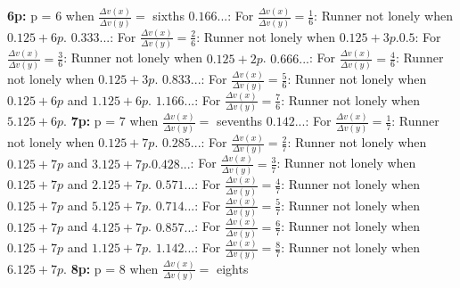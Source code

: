 \documentclass[12pt, a4paper]{article}
\begin{document}
\newline
\newline
\textbf{6p:}
p = $6$ when $\frac{\Delta v(x)}{\Delta v(y)} =$ sixths
\newline
\newline
$0.166...$: For $\frac{\Delta v(x)}{\Delta v(y)} = \frac{1}{6}$: Runner not lonely when $0.125+6p$. \newline $0.333...$: For $\frac{\Delta v(x)}{\Delta v(y)} = \frac{2}{6}$: Runner not lonely when $0.125+3p$.\newline $0.5$: For $\frac{\Delta v(x)}{\Delta v(y)} = \frac{3}{6}$: Runner not lonely when $0.125+2p$. \newline $0.666...$: For $\frac{\Delta v(x)}{\Delta v(y)} = \frac{4}{6}$: Runner not lonely when $0.125+3p$. \newline $0.833...$: For $\frac{\Delta v(x)}{\Delta v(y)} = \frac{5}{6}$: Runner not lonely when $0.125+6p$ and $1.125+6p$. \newline $1.166...$: For $\frac{\Delta v(x)}{\Delta v(y)} = \frac{7}{6}$: Runner not lonely when $5.125+6p$.
\newline
\newline
\textbf{7p:}
p = $7$ when $\frac{\Delta v(x)}{\Delta v(y)} =$ sevenths
\newline
\newline
$0.142...$: For $\frac{\Delta v(x)}{\Delta v(y)} = \frac{1}{7}$: Runner not lonely when $0.125+7p$. \newline $0.285...$: For $\frac{\Delta v(x)}{\Delta v(y)} = \frac{2}{7}$: Runner not lonely when $0.125+7p$ and $3.125+7p$.\newline $0.428...$: For $\frac{\Delta v(x)}{\Delta v(y)} = \frac{3}{7}$: Runner not lonely when $0.125+7p$ and $2.125+7p$. \newline $0.571...$: For $\frac{\Delta v(x)}{\Delta v(y)} = \frac{4}{7}$: Runner not lonely when $0.125+7p$ and $5.125+7p$. \newline $0.714...$: For $\frac{\Delta v(x)}{\Delta v(y)} = \frac{5}{7}$: Runner not lonely when $0.125+7p$ and $4.125+7p$. \newline $0.857...$: For $\frac{\Delta v(x)}{\Delta v(y)} = \frac{6}{7}$: Runner not lonely when $0.125+7p$ and $1.125+7p$. \newline $1.142...$: For $\frac{\Delta v(x)}{\Delta v(y)} = \frac{8}{7}$: Runner not lonely when $6.125+7p$.
\newline
\newline
\textbf{8p:}
p = $8$ when $\frac{\Delta v(x)}{\Delta v(y)} =$ eights
\end{document}
